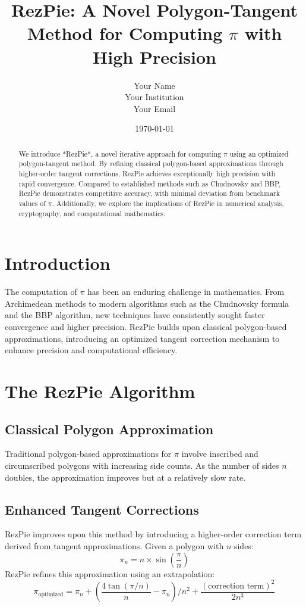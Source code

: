 \documentclass{article}
\title{RezPie: A Novel Polygon-Tangent Method for Computing $\pi$ with High Precision}
\author{Your Name \\ \small Your Institution \\ \small Your Email}
\date{\today}
\begin{document}
\maketitle

\begin{abstract}
We introduce *RezPie*, a novel iterative approach for computing $\pi$ using an optimized polygon-tangent method. By refining classical polygon-based approximations through higher-order tangent corrections, RezPie achieves exceptionally high precision with rapid convergence. Compared to established methods such as Chudnovsky and BBP, RezPie demonstrates competitive accuracy, with minimal deviation from benchmark values of $\pi$. Additionally, we explore the implications of RezPie in numerical analysis, cryptography, and computational mathematics.
\end{abstract}

\section{Introduction}
The computation of $\pi$ has been an enduring challenge in mathematics. From Archimedean methods to modern algorithms such as the Chudnovsky formula and the BBP algorithm, new techniques have consistently sought faster convergence and higher precision. RezPie builds upon classical polygon-based approximations, introducing an optimized tangent correction mechanism to enhance precision and computational efficiency.

\section{The RezPie Algorithm}
\subsection{Classical Polygon Approximation}
Traditional polygon-based approximations for $\pi$ involve inscribed and circumscribed polygons with increasing side counts. As the number of sides $n$ doubles, the approximation improves but at a relatively slow rate.

\subsection{Enhanced Tangent Corrections}
RezPie improves upon this method by introducing a higher-order correction term derived from tangent approximations. Given a polygon with $n$ sides:
\begin{equation}
\pi_n = n \times \sin\left(\frac{\pi}{n}\right)
\end{equation}
RezPie refines this approximation using an extrapolation:
\begin{equation}
\pi_{\text{optimized}} = \pi_n + \left(\frac{4 \tan(\pi/n)}{n} - \pi_n\right) / n^2 + \frac{(\text{correction term})^2}{2 n^3}
\end{equation}
\end{document}
